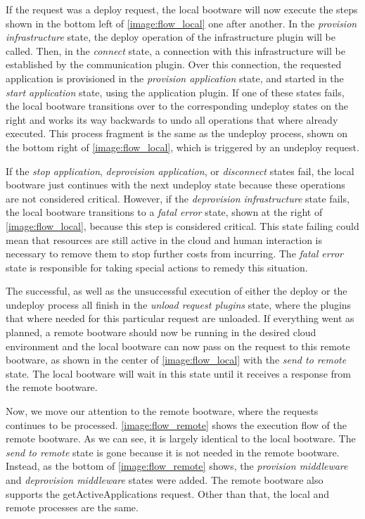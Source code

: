 If the request was a deploy request, the local bootware will now execute the steps shown in the bottom left of \autoref{image:flow_local} one after another.
In the \textit{provision infrastructure} state, the deploy operation of the infrastructure plugin will be called.
Then, in the \textit{connect} state, a connection with this infrastructure will be established by the communication plugin.
Over this connection, the requested application is provisioned in the \textit{provision application} state, and started in the \textit{start application} state, using the application plugin.
If one of these states fails, the local bootware transitions over to the corresponding undeploy states on the right and works its way backwards to undo all operations that where already executed.
This process fragment is the same as the undeploy process, shown on the bottom right of \autoref{image:flow_local}, which is triggered by an undeploy request.

If the \textit{stop application}, \textit{deprovision application}, or \textit{disconnect} states fail, the local bootware just continues with the next undeploy state because these operations are not considered critical.
However, if the \textit{deprovision infrastructure} state fails, the local bootware transitions to a \textit{fatal error} state, shown at the right of \autoref{image:flow_local}, because this step is considered critical.
This state failing could mean that resources are still active in the cloud and human interaction is necessary to remove them to stop further costs from incurring.
The \textit{fatal error} state is responsible for taking special actions to remedy this situation.

The successful, as well as the unsuccessful execution of either the deploy or the undeploy process all finish in the \textit{unload request plugins} state, where the plugins that where needed for this particular request are unloaded.
If everything went as planned, a remote bootware should now be running in the desired cloud environment and the local bootware can now pass on the request to this remote bootware, as shown in the center of \autoref{image:flow_local} with the \textit{send to remote} state.
The local bootware will wait in this state until it receives a response from the remote bootware.

Now, we move our attention to the remote bootware, where the requests continues to be processed.
\autoref{image:flow_remote} shows the execution flow of the remote bootware.
As we can see, it is largely identical to the local bootware.
The \textit{send to remote} state is gone because it is not needed in the remote bootware.
Instead, as the bottom of \autoref{image:flow_remote} shows, the \textit{provision middleware} and \textit{deprovision middleware} states were added.
The remote bootware also supports the getActiveApplications request.
Other than that, the local and remote processes are the same.


